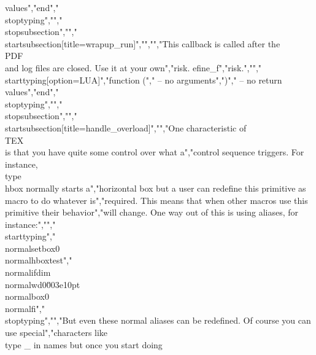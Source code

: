values","end","\\stoptyping","","\\stopsubsection","","\\startsubsection[title=wrapup_run]","","","This callback is called after the \\PDF\\ and log files are closed. Use it at your own","risk. efine_f","risk.","","\\starttyping[option=LUA]","function (","    -- no arguments",")","    -- no return values","end","\\stoptyping","","\\stopsubsection","","\\startsubsection[title=handle_overload]","","One characteristic of \\TEX\\ is that you have quite some control over what a","control sequence triggers. For instance, \\type {\\hbox} normally starts a","horizontal box but a user can redefine this primitive as macro to do whatever is","required. This means that when other macros use this primitive their behavior","will change. One way out of this is using aliases, for instance:","","\\starttyping","\\normalsetbox0\\normalhbox{test}","\\normalifdim\\normalwd0\u003e10pt \\normalbox0 \\normalfi","\\stoptyping","","But even these normal aliases can be redefined. Of course you can use special","characters like \\type {_} in names but once you start doing 